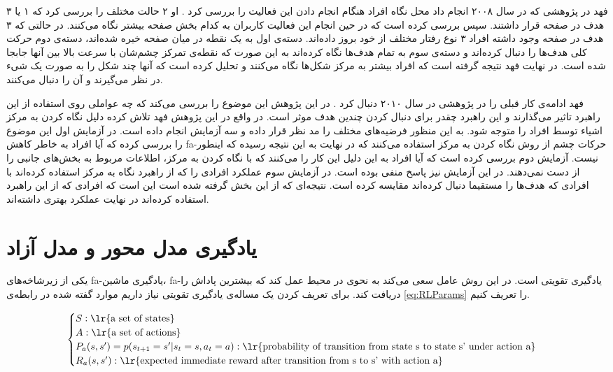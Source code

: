 \documentclass[twoside, a4paper,11pt]{book}
\numberwithin{equation}{chapter}
\numberwithin{table}{chapter}
\numberwithin{figure}{chapter}
\numberwithin{equation}{chapter}
\newcommand{\mls}[1]{\gls{fa-#1}\glsuseri{la-#1}}
\begin{document}
فهد در پژوهشی که در سال ۲۰۰۸ انجام داد محل نگاه افراد هنگام انجام دادن این فعالیت را بررسی کرد \cite{fehd2008whereLook}. او ۲ حالت مختلف را بررسی کرد که ۱ یا ۳ هدف در صفحه قرار داشتند. سپس بررسی کرده است که در حین انجام این فعالیت کاربران به کدام بخش صفحه بیشتر نگاه می‌کنند. در حالتی که ۳ هدف در صفحه وجود داشته افراد ۳ نوع رفتار مختلف از خود بروز داده‌اند. دسته‌ی اول به یک نقطه در میان صفحه خیره شده‌اند، دسته‌ی دوم حرکت کلی هدف‌ها را دنبال کرده‌اند و دسته‌ی سوم به تمام هدف‌ها نگاه کرده‌اند به این صورت که نقطه‌ی تمرکز چشم‌شان با سرعت بالا بین آنها جابجا شده است. در نهایت فهد نتیجه گرفته است که افراد بیشتر به مرکز شکل‌ها نگاه می‌کنند و تحلیل کرده است که آنها چند شکل را به صورت یک شیء در نظر می‌گیرند و آن را دنبال می‌کنند.

فهد ادامه‌ی کار قبلی را در پژوهشی در سال ۲۰۱۰ دنبال کرد \cite{fehd2010centerLook}. در این پژوهش این موضوع را بررسی می‌کند که چه عواملی روی استفاده از این راهبرد تاثیر می‌گذارند و این راهبرد چقدر برای دنبال کردن چندین هدف موثر است. در واقع در این پژوهش فهد تلاش کرده دلیل نگاه کردن به مرکز اشیاء توسط افراد را متوجه شود. به این منظور فرضیه‌های مختلف را مد نظر قرار داده و سه آزمایش انجام داده است. در آزمایش اول این موضوع را بررسی کرده که آیا افراد به خاطر کاهش \mls{حرکات چشم} از روش نگاه کردن به مرکز استفاده می‌کنند که در نهایت به این نتیجه رسیده که اینطور نیست. آزمایش دوم بررسی کرده است که آیا افراد به این دلیل این کار را می‌کنند که با نگاه کردن به مرکز، اطلاعات مربوط به بخش‌های جانبی را از دست نمی‌دهند. در این آزمایش نیز پاسخ منفی بوده است. در آزمایش سوم عملکرد افرادی را که از راهبرد نگاه به مرکز استفاده کرده‌اند با افرادی که هدف‌ها را مستقیما دنبال کرده‌اند مقایسه کرده است. نتیجه‌ای که از این بخش گرفته شده است این است که افرادی که از این راهبرد استفاده کرده‌اند در نهایت عملکرد بهتری داشته‌اند. 

\section{یادگیری مدل محور و مدل آزاد}

یکی از زیرشاخه‌های \mls{یادگیری ماشین}، \mls{یادگیری تقویتی} است. در این روش عامل سعی می‌کند به نحوی در محیط عمل کند که بیشترین پاداش را دریافت کند. برای تعریف کردن یک مساله‌ی یادگیری تقویتی نیاز داریم موارد گفته شده در رابطه‌ی \ref{eq:RLParams} را تعریف کنیم.

\begin{equation}
\label{eq:RLParams}
\begin{cases}
	S: \text{\lr{a set of states}} \\
	A:  \text{\lr{a set of actions}} \\
	P_a(s, s') = p(s_{t+1} = s'| s_t=s, a_t=a):  \text{\lr{probability of transition from state s to state s' under action a}} \\
	R_a(s, s'):  \text{\lr{expected immediate reward after transition from s to s' with action a}}

\end{cases}
\end{equation}
\end{document}
